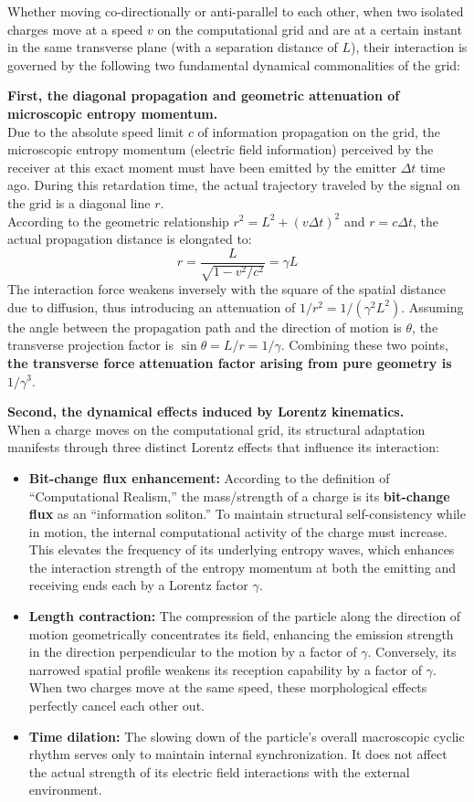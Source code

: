 \documentclass[12pt, a4paper]{article}
\begin{document}
Whether moving co-directionally or anti-parallel to each other, when two isolated charges move at a speed $v$ on the computational grid and are at a certain instant in the same transverse plane (with a separation distance of $L$), their interaction is governed by the following two fundamental dynamical commonalities of the grid:

\textbf{First, the diagonal propagation and geometric attenuation of microscopic entropy momentum.} \\
Due to the absolute speed limit $c$ of information propagation on the grid, the microscopic entropy momentum (electric field information) perceived by the receiver at this exact moment must have been emitted by the emitter $\Delta t$ time ago. During this retardation time, the actual trajectory traveled by the signal on the grid is a diagonal line $r$. \\
According to the geometric relationship $r^2 = L^2 + (v \Delta t)^2$ and $r = c \Delta t$, the actual propagation distance is elongated to:
\[
r = \frac{L}{\sqrt{1 - v^2/c^2}} = \gamma L
\]
The interaction force weakens inversely with the square of the spatial distance due to diffusion, thus introducing an attenuation of $1/r^2 = 1/(\gamma^2 L^2)$. Assuming the angle between the propagation path and the direction of motion is $\theta$, the transverse projection factor is $\sin\theta = L/r = 1/\gamma$. Combining these two points, \textbf{the transverse force attenuation factor arising from pure geometry is $1/\gamma^3$}.

\textbf{Second, the dynamical effects induced by Lorentz kinematics.} \\
When a charge moves on the computational grid, its structural adaptation manifests through three distinct Lorentz effects that influence its interaction:
\begin{itemize}
    \item \textbf{Bit-change flux enhancement:} According to the definition of ``Computational Realism,'' the mass/strength of a charge is its \textbf{bit-change flux} as an ``information soliton.'' To maintain structural self-consistency while in motion, the internal computational activity of the charge must increase. This elevates the frequency of its underlying entropy waves, which enhances the interaction strength of the entropy momentum at both the emitting and receiving ends each by a Lorentz factor $\gamma$.
    \item \textbf{Length contraction:} The compression of the particle along the direction of motion geometrically concentrates its field, enhancing the emission strength in the direction perpendicular to the motion by a factor of $\gamma$. Conversely, its narrowed spatial profile weakens its reception capability by a factor of $\gamma$. When two charges move at the same speed, these morphological effects perfectly cancel each other out.
    \item \textbf{Time dilation:} The slowing down of the particle's overall macroscopic cyclic rhythm serves only to maintain internal synchronization. It does not affect the actual strength of its electric field interactions with the external environment.
\end{itemize}
\end{document}
